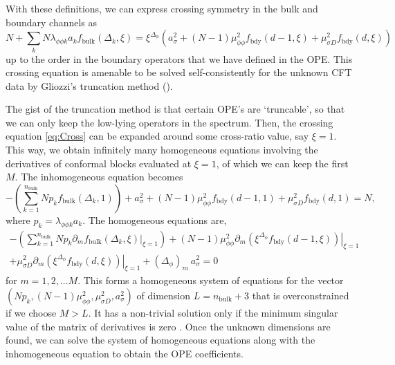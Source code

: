 \documentclass[a4paper,11pt]{article}
\begin{document}
With these definitions, we can express crossing symmetry in the bulk and boundary channels as
\begin{equation}
\label{eq:Cross}
    N + \sum_k N\lambda_{\phi\phi k}a_kf_{\text{bulk}}(\Delta_k, \xi) = \xi^{\Delta_{\phi}}\left(a_{\sigma}^2 + (N-1)\mu_{\phi\phi}^2f_{\text{bdy}}(d-1,\xi) + \mu_{\sigma D}^2f_{\text{bdy}}(d, \xi)\right)
\end{equation}
up to the order in the boundary operators that we have defined in the OPE. This crossing equation is amenable to be solved self-consistently for the unknown CFT data by Gliozzi's truncation method (\cite{Gliozzi}).

The gist of the truncation method is that certain OPE's are `truncable', so that we can only keep the low-lying operators in the spectrum. Then, the crossing equation \ref{eq:Cross} can be expanded around some cross-ratio value, say $\xi = 1$. This way, we obtain infinitely many homogeneous equations involving the derivatives of conformal blocks evaluated at $\xi = 1$, of which we can keep the first $M$. 
The inhomogeneous equation becomes
\begin{equation}
-\left(\sum_{k = 1}^{n_{\text{bulk}}} N p_kf_{\text{bulk}}(\Delta_k, 1)\right) + a_{\sigma}^2 + (N - 1)\mu_{\phi\phi}^2f_{\text{bdy}}(d-1, 1) + \mu_{\sigma D}^2f_{\text{bdy}}(d,1) = N,
\end{equation}
where $p_k = \lambda_{\phi\phi k}a_k$. The homogeneous equations are,
\begin{multline}
   -\left(\sum_{k = 1}^{n_{\text{bulk}}} N p_k\left.\partial_m f_{\text{bulk}}(\Delta_k, \xi)\right|_{\xi = 1}\right) + (N - 1)\mu_{\phi\phi}^2\left.\partial_m(\xi^{\Delta_{\phi}}f_{\text{bdy}}(d-1, \xi))\right|_{\xi = 1}\\
        + \mu_{\sigma D}^2\left.\partial_m(\xi^{\Delta_{\phi}}f_{\text{bdy}}(d,\xi))\right|_{\xi = 1} + (\Delta_{\phi})_{m}\ a_{\sigma}^2 = 0
\end{multline}
for $m = 1,2,\ldots M$. This forms a homogeneous system of equations for the vector $(Np_k, (N-1)\mu_{\phi\phi}^2, \mu_{\sigma D}^2, a_{\sigma}^2 )$ of dimension $L = n_{\text{bulk}} + 3$ that is overconstrained if we choose $M > L$. It has a non-trivial solution only if the minimum singular value of the matrix of derivatives is zero \cite{Leclair}. Once the unknown dimensions are found, we can solve the system of homogeneous equations along with the inhomogeneous equation to obtain the OPE coefficients.
\end{document}
